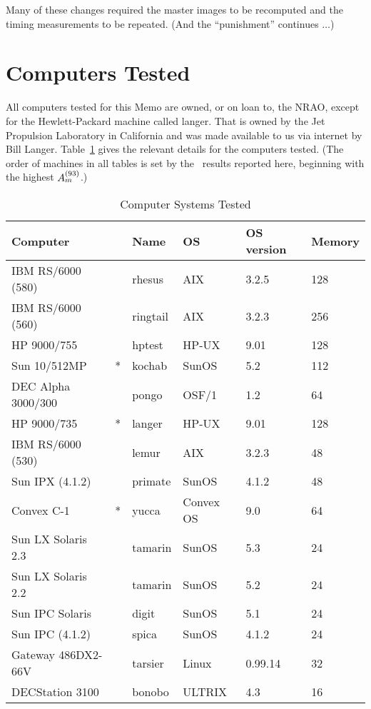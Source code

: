 Many of these changes required the master images to be recomputed and
the timing measurements to be repeated.  (And the ``punishment''
continues $\ldots$)

\section{Computers Tested}

All computers tested for this Memo are owned, or on loan to, the NRAO,
except for the Hewlett-Packard machine called langer.  That is owned
by the Jet Propulsion Laboratory in California and was made available
to us via internet by Bill Langer.  Table~\ref{ta:machines} gives the
relevant details for the computers tested.  (The order of machines in
all tables is set by the \AMark\ results reported here, beginning with
the highest $A_m^{(93)}$.)
\begin{table}
\protect\begin{center}
\protect\begin{tabular}{|lc|l|l|l|l|} \hline
Computer          &   & Name    & OS & OS version & Memory \\
\hline
IBM RS/6000 (580) &   & rhesus  & AIX       & 3.2.5   & 128 \\
IBM RS/6000 (560) &   & ringtail& AIX       & 3.2.3   & 256 \\
HP 9000/755       &   & hptest  & HP-UX     & 9.01    & 128 \\
Sun 10/512MP      & * & kochab  & SunOS     & 5.2     & 112 \\
DEC Alpha 3000/300&   & pongo   & OSF/1     & 1.2     &  64 \\
HP 9000/735       & * & langer  & HP-UX     & 9.01    & 128 \\
IBM RS/6000 (530) &   & lemur   & AIX       & 3.2.3   &  48 \\
Sun IPX (4.1.2)   &   & primate & SunOS     & 4.1.2   &  48 \\
Convex C-1        & * & yucca   & Convex OS & 9.0     &  64 \\
Sun LX Solaris 2.3&   & tamarin & SunOS     & 5.3     &  24 \\
Sun LX Solaris 2.2&   & tamarin & SunOS     & 5.2     &  24 \\
Sun IPC Solaris   &   & digit   & SunOS     & 5.1     &  24 \\
Sun IPC (4.1.2)   &   & spica   & SunOS     & 4.1.2   &  24 \\
Gateway 486DX2-66V&   & tarsier & Linux     & 0.99.14 &  32 \\
DECStation 3100   &   & bonobo  & ULTRIX    & 4.3     &  16 \\
\hline
\end{tabular}
\end{center}
\caption{Computer Systems Tested}
\label{ta:machines}
\end{table}
